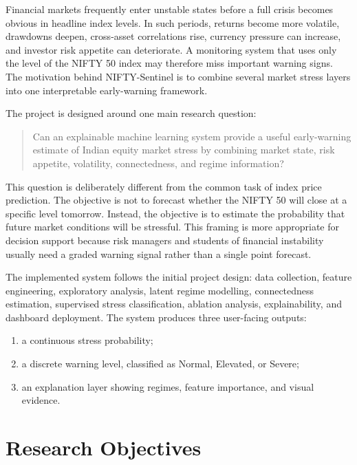 \documentclass[12pt,a4paper]{article}
\begin{document}
Financial markets frequently enter unstable states before a full crisis becomes obvious in headline index levels. In such periods, returns become more volatile, drawdowns deepen, cross-asset correlations rise, currency pressure can increase, and investor risk appetite can deteriorate. A monitoring system that uses only the level of the NIFTY 50 index may therefore miss important warning signs. The motivation behind NIFTY-Sentinel is to combine several market stress layers into one interpretable early-warning framework.

The project is designed around one main research question:

\begin{quote}
Can an explainable machine learning system provide a useful early-warning estimate of Indian equity market stress by combining market state, risk appetite, volatility, connectedness, and regime information?
\end{quote}

This question is deliberately different from the common task of index price prediction. The objective is not to forecast whether the NIFTY 50 will close at a specific level tomorrow. Instead, the objective is to estimate the probability that future market conditions will be stressful. This framing is more appropriate for decision support because risk managers and students of financial instability usually need a graded warning signal rather than a single point forecast.

The implemented system follows the initial project design: data collection, feature engineering, exploratory analysis, latent regime modelling, connectedness estimation, supervised stress classification, ablation analysis, explainability, and dashboard deployment. The system produces three user-facing outputs:

\begin{enumerate}
    \item a continuous stress probability;
    \item a discrete warning level, classified as Normal, Elevated, or Severe;
    \item an explanation layer showing regimes, feature importance, and visual evidence.
\end{enumerate}

\section{Research Objectives}
\end{document}
